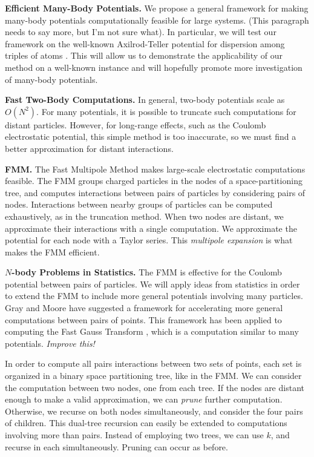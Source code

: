 \documentclass[twoside,leqno, 12pt]{article}
\begin{document}
\textbf{Efficient Many-Body Potentials.}  We propose a general framework for making many-body potentials computationally feasible for large systems.  (This paragraph needs to say more, but I'm not sure what).  In particular, we will test our framework on the well-known Axilrod-Teller potential for dispersion among triples of atoms \cite{axilrod_teller}.  This will allow us to demonstrate the applicability of our method on a well-known instance and will hopefully promote more investigation of many-body potentials.  




\textbf{Fast Two-Body Computations.}  In general, two-body potentials scale as $O(N^2)$.  For many potentials, it is possible to truncate such computations for distant particles.  However, for long-range effects, such as the Coulomb electrostatic potential, this simple method is too inaccurate, so we must find a better approximation for distant interactions.  

\textbf{FMM.}  The Fast Multipole Method \cite{grngard} makes large-scale electrostatic computations feasible.  The FMM groups charged particles in the nodes of a space-partitioning tree, and computes interactions between pairs of particles by considering pairs of nodes.  Interactions between nearby groups of particles can be computed exhaustively, as in the truncation method.  When two nodes are distant, we approximate their interactions with a single computation.  We approximate the potential for each node with a Taylor series.  This \emph{multipole expansion} is what makes the FMM efficient.


\textbf{$N$-body Problems in Statistics.}  The FMM is effective for the Coulomb potential between pairs of particles.  We will apply ideas from statistics in order to extend the FMM to include more general potentials involving many particles.  Gray and Moore \cite{gray_nbody} have suggested a framework for accelerating more general computations between pairs of points.  This framework has been applied to computing the Fast Gauss Transform \cite{NIPS2005_570}, which is a computation similar to many potentials.  \textit{Improve this!}

In order to compute all pairs interactions between two sets of points, each set is organized in a binary space partitioning tree, like in the FMM.  We can consider the computation between two nodes, one from each tree.  If the nodes are distant enough to make a valid approximation, we can \emph{prune} further computation.  Otherwise, we recurse on both nodes simultaneously, and consider the four pairs of children.  
This dual-tree recursion can easily be extended to computations involving more than pairs.  Instead of employing two trees, we can use $k$, and recurse in each simultaneously.  Pruning can occur as before.  
\end{document}
